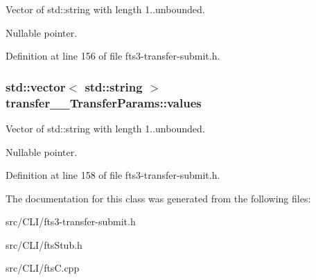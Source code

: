 Vector of std::string with length 1..unbounded. 

Nullable pointer. 

Definition at line 156 of file fts3-\/transfer-\/submit.h.

\subsubsection[{values}]{\setlength{\rightskip}{0pt plus 5cm}std::vector$<$ std::string $>$ {\bf transfer\_\-\_\-TransferParams::values}}\label{classtransfer____TransferParams_a66e689a5a75be59fb3025c3681983930}


Vector of std::string with length 1..unbounded. 

Nullable pointer. 

Definition at line 158 of file fts3-\/transfer-\/submit.h.



The documentation for this class was generated from the following files:\begin{DoxyCompactItemize}
\item 
src/CLI/fts3-\/transfer-\/submit.h\item 
src/CLI/ftsStub.h\item 
src/CLI/ftsC.cpp\end{DoxyCompactItemize}
